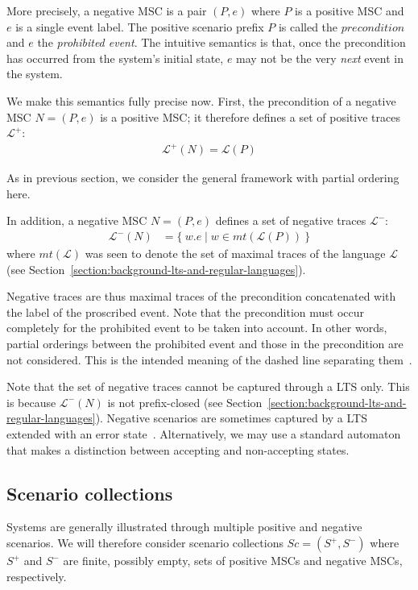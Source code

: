 More precisely, a negative MSC is a pair $(P,e)$ where $P$ is a positive MSC and $e$ is a single event label. The positive scenario prefix $P$ is called the $precondition$ and $e$ the \emph{prohibited event}. The intuitive semantics is that, once the precondition has occurred from the system's initial state, $e$ may not be the very \emph{next} event in the system. 

We make this semantics fully precise now. First, the precondition of a negative MSC $N = (P,e)$ is a positive MSC; it therefore defines a set of positive traces $\mathcal{L}^{+}$:
\begin{align}
\mathcal{L}^{+}(N) = \mathcal{L}(P)
\end{align}

As in previous section, we consider the general framework with partial ordering here.

\noindent In addition, a negative MSC $N = (P,e)$ defines a set of negative traces $\mathcal{L}^{-}$:
\begin{align}
\mathcal{L}^{-}(N) &= \{~w.e \mid w \in mt(\mathcal{L}(P))~\}
\end{align}
\noindent where $mt(\mathcal{L})$ was seen to denote the set of maximal traces of the language $\mathcal{L}$ (see Section~\ref{section:background-lts-and-regular-languages}).

Negative traces are thus maximal traces of the precondition concatenated with the label of the proscribed event. Note that the precondition must occur completely for the prohibited event to be taken into account. In other words, partial orderings between the prohibited event and those in the precondition are not considered. This is the intended meaning of the dashed line separating them~\cite{Uchitel:2004}. 

Note that the set of negative traces cannot be captured through a LTS only. This is because $\mathcal{L}^{-}(N)$ is not prefix-closed (see Section~\ref{section:background-lts-and-regular-languages}). Negative scenarios are sometimes captured by a LTS extended with an error state~\cite{Uchitel:2004}. Alternatively, we may use a standard automaton that makes a distinction between accepting and non-accepting states. 

\subsection{Scenario collections\label{subsection:background-scenario-collections}}

Systems are generally illustrated through multiple positive and negative scenarios. We will therefore consider scenario collections $Sc = (S^+,S^-)$ where $S^+$ and $S^-$ are finite, possibly empty, sets of positive MSCs and negative MSCs, respectively.

